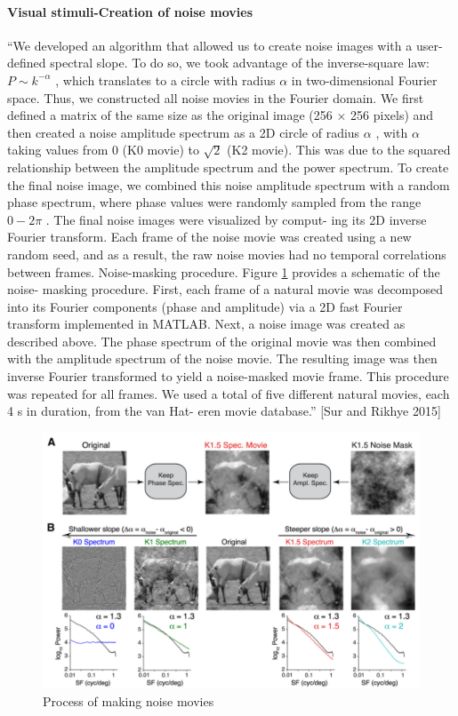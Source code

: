 \documentclass[11pt]{article}
\begin{document}
\begin{enumerate}
    \paragraph{Visual stimuli-Creation of noise movies}
    ``We developed an algorithm that allowed us to
    create noise images with a user-defined spectral slope. To do so, we took
    advantage of the inverse-square law: $P \sim k^{-\alpha}$ , which translates to a circle
    with radius $\alpha$ in two-dimensional Fourier space. Thus, we constructed all
    noise movies in the Fourier domain. We first defined a matrix of the same
    size as the original image (256 $\times$ 256 pixels) and then created a noise
    amplitude spectrum as a 2D circle of radius $\alpha$ , with $\alpha$ taking values from
    0 (K0 movie) to $\sqrt{2}$ (K2 movie). This was due to the squared relationship
    between the amplitude spectrum and the power spectrum. To create the
    final noise image, we combined this noise amplitude spectrum with a
    random phase spectrum, where phase values were randomly sampled
    from the range $0 - 2\pi$ . The final noise images were visualized by comput-
    ing its 2D inverse Fourier transform. Each frame of the noise movie was
    created using a new random seed, and as a result, the raw noise movies
    had no temporal correlations between frames.
    Noise-masking procedure. Figure \ref{img:noise} provides a schematic of the noise-
    masking procedure. First, each frame of a natural movie was decomposed into its Fourier components (phase and amplitude) via a 2D fast Fourier
    transform implemented in MATLAB. Next, a noise image was created as
    described above. The phase spectrum of the original movie was then
    combined with the amplitude spectrum of the noise movie. The resulting
    image was then inverse Fourier transformed to yield a noise-masked
    movie frame. This procedure was repeated for all frames. We used a total
    of five different natural movies, each 4 s in duration, from the van Hat-
    eren movie database.'' [Sur and Rikhye 2015]
    \begin{figure}
        \centering
        \includegraphics[width=.8\linewidth]{img/noise.png}
        \caption{Process of making noise movies}
        \label{img:noise}
    \end{figure}
\end{enumerate}
\end{document}
